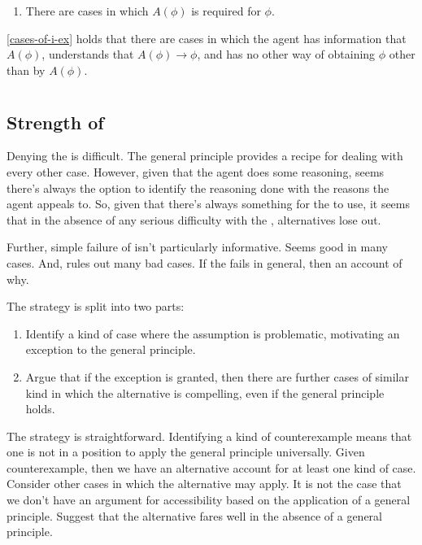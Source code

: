 \documentclass[10pt]{article}
\begin{document}
\begin{enumerate}
\item\label{cases-of-i-ex} There are cases in which \(A(\phi)\) is required for \(\phi\).
\end{enumerate}

\ref{cases-of-i-ex} holds that there are cases in which the agent has information that \(A(\phi)\), understands that \(A(\phi) \rightarrow \phi\), and has no other way of obtaining \(\phi\) other than by \(A(\phi)\).

\section{\mp{}}
\label{sec:mp}

\subsection{Strength of \mp{}}
\label{sec:appeal-main-premise}

Denying the \mp{} is difficult.
The general principle provides a recipe for dealing with every other case.
However, given that the agent does some reasoning, seems there's always the option to identify the reasoning done with the reasons the agent appeals to.
So, given that there's always something for the \mp{} to use, it seems that in the absence of any serious difficulty with the \mp{}, alternatives lose out.

Further, simple failure of \mp{} isn't particularly informative.
Seems good in many cases.
And, rules out many bad cases.
If the \mp{} fails in general, then an account of why.

The strategy is split into two parts:
\begin{enumerate}
\item Identify a kind of case where the assumption is problematic, motivating an exception to the general principle.
\item Argue that if the exception is granted, then there are further cases of similar kind in which the alternative is compelling, even if the general principle holds.
\end{enumerate}

The strategy is straightforward.
Identifying a kind of counterexample means that one is not in a position to apply the general principle universally.
Given counterexample, then we have an alternative account for at least one kind of case.
Consider other cases in which the alternative may apply.
It is not the case that we don't have an argument for accessibility based on the application of a general principle.
Suggest that the alternative fares well in the absence of a general principle.
\end{document}

